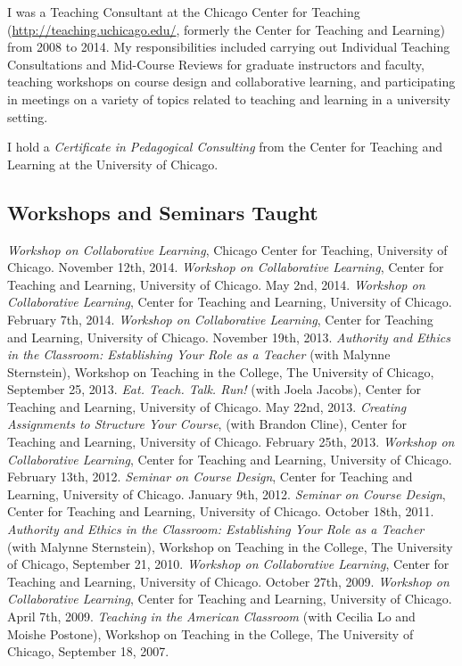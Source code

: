 \documentclass{resume}
\begin{document}
I was a Teaching Consultant at the Chicago Center for Teaching (\url{http://teaching.uchicago.edu/}, formerly the Center for Teaching and Learning) from 2008 to 2014. My responsibilities included carrying out Individual Teaching Consultations and Mid-Course Reviews for graduate instructors and faculty, teaching workshops on course design and collaborative learning, and participating in meetings on a variety of topics related to teaching and learning in a university setting.

I hold a \emph{Certificate in Pedagogical Consulting} from the Center for Teaching and Learning at the University of Chicago.

\subsection*{Workshops and Seminars Taught}
\begin{category}{}
\citembullet \emph{Workshop on Collaborative Learning}, Chicago Center for Teaching, University of Chicago. November 12th, 2014.
\citembullet \emph{Workshop on Collaborative Learning}, Center for Teaching and Learning, University of Chicago. May 2nd, 2014.
\citembullet \emph{Workshop on Collaborative Learning}, Center for Teaching and Learning, University of Chicago. February 7th, 2014.
\citembullet \emph{Workshop on Collaborative Learning}, Center for Teaching and Learning, University of Chicago. November 19th, 2013.
\citembullet \emph{Authority and Ethics in the Classroom: Establishing Your Role as a Teacher} (with Malynne Sternstein), Workshop on Teaching in the College, The University of Chicago, September 25, 2013.
\citembullet \emph{Eat. Teach. Talk. Run!} (with Joela Jacobs), Center for Teaching and Learning, University of Chicago. May 22nd, 2013.
\citembullet \emph{Creating Assignments to Structure Your Course}, (with Brandon Cline), Center for Teaching and Learning, University of Chicago. February 25th, 2013.
\citembullet \emph{Workshop on Collaborative Learning}, Center for Teaching and Learning, University of Chicago. February 13th, 2012.
\citembullet \emph{Seminar on Course Design}, Center for Teaching and Learning, University of Chicago. January 9th, 2012.
\citembullet \emph{Seminar on Course Design}, Center for Teaching and Learning, University of Chicago. October 18th, 2011.
\citembullet \emph{Authority and Ethics in the Classroom: Establishing Your Role as a Teacher} (with Malynne Sternstein), Workshop on Teaching in the College, The University of Chicago, September 21, 2010.
\citembullet \emph{Workshop on Collaborative Learning}, Center for Teaching and Learning, University of Chicago. October 27th, 2009.
\citembullet \emph{Workshop on Collaborative Learning}, Center for Teaching and Learning, University of Chicago. April 7th, 2009. 
\citembullet \emph{Teaching in the American Classroom} (with Cecilia Lo and Moishe Postone), Workshop on Teaching in the College, The University of Chicago, September 18, 2007.
\end{category}
\end{document}
